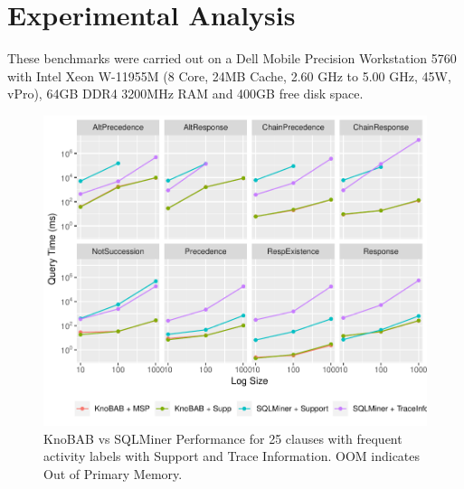 
\section{Experimental Analysis}\label{sec:exp}
These benchmarks were carried out on a Dell Mobile Precision Workstation 5760 with 
Intel Xeon W-11955M (8 Core, 24MB Cache, 2.60 GHz to 5.00 GHz, 45W, vPro), 64GB DDR4 3200MHz RAM and 400GB free disk space.
\begin{figure}[!t]
	\centering
	\includegraphics[width=.7\textwidth]{images/Expo.pdf}
	\caption{KnoBAB vs SQLMiner Performance for 25  clauses with frequent activity labels with Support and Trace Information. OOM indicates Out of Primary Memory.}\label{fig:vsSQL}
\end{figure}



